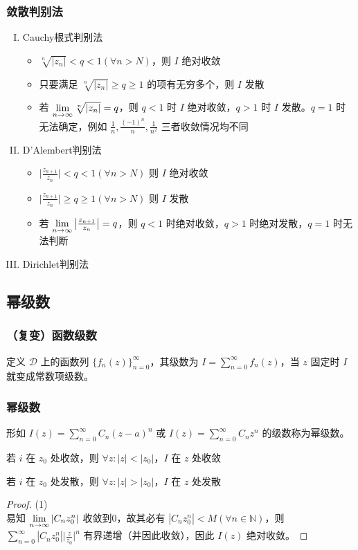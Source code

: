 \documentclass[./main.tex]{subfiles}
\begin{document}
\subsubsection{敛散判别法}
\begin{enumerate}[(I)]
    \item Cauchy根式判别法
    \begin{itemize}
        \item $\sqrt[n]{|z_n|}<q<1(\forall n>N)$，则 $I$ 绝对收敛
        \item 只要满足 $\sqrt[n]{|z_n|}\ge q\ge 1$ 的项有无穷多个，则 $I$ 发散
        \item 若 $\lim\limits_{n\rightarrow\infty}\sqrt[n]{|z_n|}=q$，则 $q<1$ 时 $I$ 绝对收敛，$q>1$ 时 $I$ 发散。$q=1$ 时无法确定，例如 $\frac{1}{n},\frac{(-1)^n}{n},\frac{1}{n^2}$ 三者收敛情况均不同
    \end{itemize}
    \item D'Alembert判别法
    \begin{itemize}
        \item $\big|\frac{z_{n+1}}{z_n}\big|<q<1(\forall n>N)$ 则 $I$ 绝对收敛
        \item $\big|\frac{z_{n+1}}{z_n}\big|\ge q\ge 1(\forall n>N)$ 则 $I$ 发散
        \item 若 $\lim\limits_{n\rightarrow\infty}\big|\frac{z_{n+1}}{z_n}\big|=q$，则 $q<1$ 时绝对收敛，$q>1$ 时绝对发散，$q=1$ 时无法判断
        \end{itemize}
    \item Dirichlet判别法
\end{enumerate}

\subsection{幂级数}
\subsubsection{（复变）函数级数}
定义 $\mathscr{D}$ 上的函数列 $\{f_n(z)\}_{n=0}^{\infty}$，其级数为 $I=\sum_{n=0}^{\infty}f_n(z)$，当 $z$ 固定时 $I$ 就变成常数项级数。
\subsubsection{幂级数}
形如 $I(z)=\sum_{n=0}^{\infty}C_n(z-a)^n$ 或 $I(z)=\sum_{n=0}^{\infty}C_nz^n$ 的级数称为幂级数。
\begin{enumerate*}
\item 若 $i$ 在 $z_0$ 处收敛，则 $\forall z:|z|<|z_0|$，$I$ 在 $z$ 处收敛
\item 若 $i$ 在 $z_0$ 处发散，则 $\forall z:|z|>|z_0|$，$I$ 在 $z$ 处发散
\end{enumerate*}
\begin{proof}(1)\\易知 $\lim\limits_{n\rightarrow\infty}|C_nz_0^n|$ 收敛到0，故其必有 $|C_nz_0^n|<M(\forall n\in\mathbb{N})$，则 $\sum_{n=0}^{\infty}|C_nz_0^n|\big|\frac{z}{z_0}\big|^n$ 有界递增（并因此收敛），因此 $I(z)$ 绝对收敛。
\end{proof}
\end{document}
